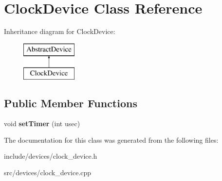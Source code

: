 \hypertarget{classClockDevice}{\section{\-Clock\-Device \-Class \-Reference}
\label{dc/d14/classClockDevice}
}
\-Inheritance diagram for \-Clock\-Device\-:\begin{figure}[H]
\begin{center}
\leavevmode
\includegraphics[height=2.000000cm]{dc/d14/classClockDevice}
\end{center}
\end{figure}
\subsection*{\-Public \-Member \-Functions}
\begin{DoxyCompactItemize}
\item 
\hypertarget{classClockDevice_a780eebde86fb6a6400894128ac37fa37}{void {\bfseries set\-Timer} (int usec)}\label{dc/d14/classClockDevice_a780eebde86fb6a6400894128ac37fa37}

\end{DoxyCompactItemize}


\-The documentation for this class was generated from the following files\-:\begin{DoxyCompactItemize}
\item 
include/devices/clock\-\_\-device.\-h\item 
src/devices/clock\-\_\-device.\-cpp\end{DoxyCompactItemize}
